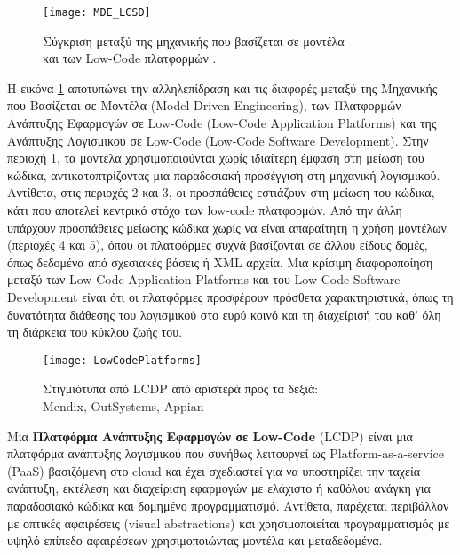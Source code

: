         \begin{figure}[h!] \noindent \centering
            \texttt{[image: MDE\_LCSD]}
            \caption{\centering Σύγκριση μεταξύ της μηχανικής που βασίζεται σε μοντέλα \\ και των Low-Code πλατφορμών \cite{MDELow}.}
            \label{fig:MDE_LCSD}
        \end{figure}

        Η εικόνα \ref{fig:MDE_LCSD} αποτυπώνει την αλληλεπίδραση και τις διαφορές μεταξύ της Μηχανικής που Βασίζεται σε Μοντέλα (Model-Driven Engineering), των Πλατφορμών Ανάπτυξης Εφαρμογών σε Low-Code (Low-Code Application Platforms) και της Ανάπτυξης Λογισμικού σε Low-Code (Low-Code Software Development). Στην περιοχή 1, τα μοντέλα χρησιμοποιούνται χωρίς ιδιαίτερη έμφαση στη μείωση του κώδικα, αντικατοπτρίζοντας μια παραδοσιακή προσέγγιση στη μηχανική λογισμικού.
        Αντίθετα, στις περιοχές 2 και 3, οι προσπάθειες εστιάζουν στη μείωση του κώδικα, κάτι που αποτελεί κεντρικό στόχο των low-code πλατφορμών. Από την άλλη υπάρχουν προσπάθειες μείωσης κώδικα χωρίς να είναι απαραίτητη η χρήση μοντέλων (περιοχές 4 και 5), όπου οι πλατφόρμες συχνά βασίζονται σε άλλου είδους δομές, όπως δεδομένα από σχεσιακές βάσεις ή XML αρχεία. Μια κρίσιμη διαφοροποίηση μεταξύ των Low-Code Application Platforms και του Low-Code Software Development είναι ότι οι πλατφόρμες προσφέρουν πρόσθετα χαρακτηριστικά, όπως τη δυνατότητα διάθεσης του λογισμικού στο ευρύ κοινό και τη διαχείρισή του καθ' όλη τη διάρκεια του κύκλου ζωής του.

        \begin{figure}[h!] \noindent \centering
            \texttt{[image: LowCodePlatforms]}
            \caption{\centering Στιγμιότυπα από LCDP από αριστερά προς τα δεξιά: \\ Mendix, OutSystems, Appian \cite{LowCodeMendix}}
            \label{fig:LowCodePlatforms}
        \end{figure}

        Μια \textbf{Πλατφόρμα Ανάπτυξης Εφαρμογών σε Low-Code} (LCDP) είναι μια πλατφόρμα ανάπτυξης λογισμικού που συνήθως λειτουργεί ως Platform-as-a-service (PaaS) βασιζόμενη στο cloud και έχει σχεδιαστεί για να υποστηρίζει την ταχεία ανάπτυξη, εκτέλεση και διαχείριση εφαρμογών με ελάχιστο ή καθόλου ανάγκη για παραδοσιακό κώδικα και δομημένο προγραμματισμό. Αντίθετα, παρέχεται περιβάλλον με οπτικές αφαιρέσεις (visual abstractions) και χρησιμοποιείται προγραμματισμός με υψηλό επίπεδο αφαιρέσεων χρησιμοποιώντας μοντέλα και μεταδεδομένα.

